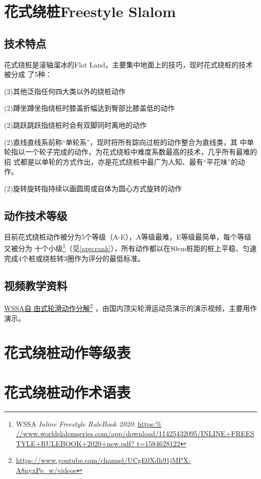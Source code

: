 \documentclass[12pt]{ctexart}
\begin{document}
\section{花式绕桩Freestyle Slalom}
\subsection{技术特点}
花式绕桩是滚轴溜冰的Flat Land，主要集中地面上的技巧，现时花式绕桩的技术被分成
了5种\cite{wiki:skating}：

\bsctype(2){其他}泛指任何四大类以外的绕桩动作

\bsctype(2){蹲坐}蹲坐指绕桩时膝盖折幅达到臀部比膝盖低的动作

\bsctype(2){跳跃}跳跃指绕桩时会有双脚同时离地的动作

\bsctype(2){直线}直线系前称“单轮系”，现时将所有踪向过桩的动作整合为直线类，其
中单轮指以一个轮子完成的动作，为花式绕桩中难度系数最高的技术，几乎所有最难的招
式都是以单轮的方式作出，亦是花式绕桩中最广为人知、最有“平花味”的动作。

\bsctype(2){旋转}旋转指持续以画圆周或自体为圆心方式旋转的动作

\subsection{动作技术等级}
目前花式绕桩动作被分为5个等级（A-E），A等级最难，E等级最简单，每个等级又被分为
十个小级\footnote{WSSA \emph{Inline Freestyle RuleBook 2020}: \url{https:%
//www.worldslalomseries.com/app/download/11425432095/INLINE+FREESTYLE+RULEBOOK+2020+new.pdf?
t=1584628122}}（见\autoref{app:rank}），所有动作都以在80\si{cm}桩距的桩上平稳、匀速
完成4个桩或绕桩转3圈作为评分的最低标准。

\subsection{视频教学资料}
\href{https://www.youtube.com/channel/UCgE0Xdh91jMPX-A8nyxPe_w/videos}{WSSA自
由式轮滑动作分解}\footnote{\url{https://www.youtube.com/channel/UCgE0Xdh91jMPX-A8nyxPe_w/videos}}
，由国内顶尖轮滑运动员演示的演示视频，主要用作演示。

\clearpage


\clearpage
\begin{appendices}
  \section{花式绕桩动作等级表}
  \label{app:rank}
  
  \clearpage
  \section{花式绕桩动作术语表}
  
\end{appendices}
\end{document}
